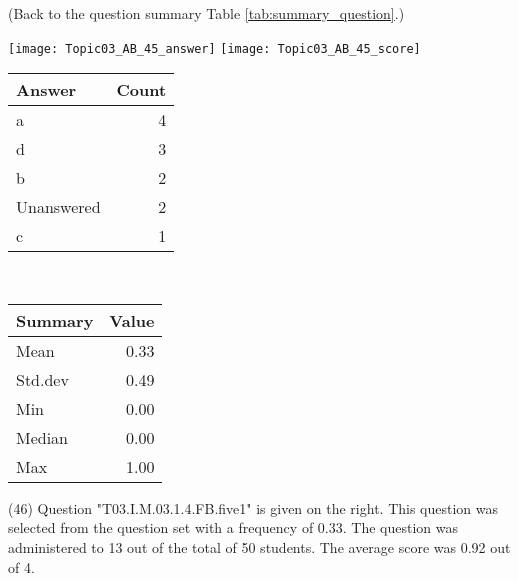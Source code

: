\documentclass[12pt,english,nohyper]{tufte-handout}\usepackage[]{graphicx}\usepackage[]{color}
\begin{document}
 (Back to the question summary Table \ref{tab:summary_question}.)

\begin{center} \texttt{[image: Topic03\_AB\_45\_answer]} \texttt{[image: Topic03\_AB\_45\_score]} \end{center} 

\begin{center}%
\begin{tabular}{lr}
  \hline
Answer & Count \\ 
  \hline
a &   4 \\ 
  d &   3 \\ 
  b &   2 \\ 
  Unanswered &   2 \\ 
  c &   1 \\ 
   \hline
\end{tabular}
~~~~~~~~%
\begin{tabular}{lr}
  \hline
Summary & Value \\ 
  \hline
Mean & 0.33 \\ 
  Std.dev & 0.49 \\ 
  Min & 0.00 \\ 
  Median & 0.00 \\ 
  Max & 1.00 \\ 
   \hline
\end{tabular}
\end{center}\newpage{} (46) Question "T03.I.M.03.1.4.FB.five1" is given on the right. This question was selected from the question set with a frequency of 0.33. The question was administered to 13 out of the total of 50 students. The average score was 0.92 out of 4.
\end{document}

